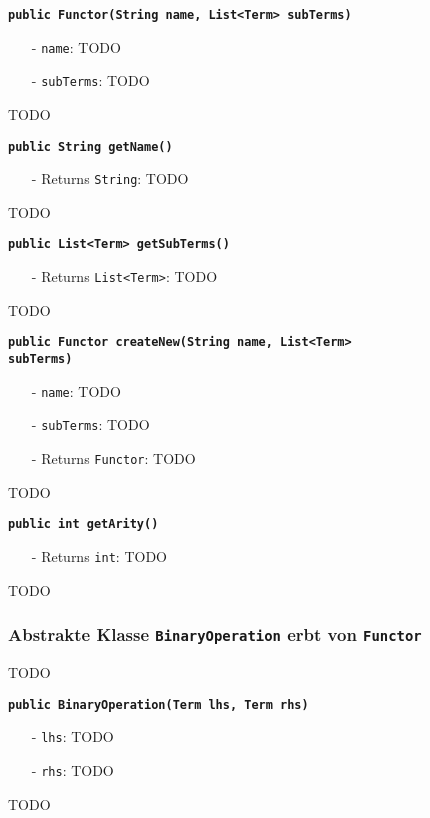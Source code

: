 \documentclass[parskip=full,11pt,twoside]{scrartcl}
\begin{document}
\textbf{\texttt{public Functor(String name, List<Term> subTerms)}}
\begin{itemize}[noitemsep]
	\item[-] \texttt{name}: TODO
	\item[-] \texttt{subTerms}: TODO
\end{itemize}
TODO

\textbf{\texttt{public String getName()}}
\begin{itemize}[noitemsep]
	\item[-] Returns \texttt{String}: TODO
\end{itemize}
TODO

\textbf{\texttt{public List<Term> getSubTerms()}}
\begin{itemize}[noitemsep]
	\item[-] Returns \texttt{List<Term>}: TODO
\end{itemize}
TODO

\textbf{\texttt{public Functor createNew(String name, List<Term>\\subTerms)}}
\begin{itemize}[noitemsep]
	\item[-] \texttt{name}: TODO
	\item[-] \texttt{subTerms}: TODO
	\item[-] Returns \texttt{Functor}: TODO
\end{itemize}
TODO

\textbf{\texttt{public int getArity()}}
\begin{itemize}[noitemsep]
	\item[-] Returns \texttt{int}: TODO
\end{itemize}
TODO

\subsubsection{Abstrakte Klasse \texttt{BinaryOperation} erbt von \texttt{Functor}}
TODO

\textbf{\texttt{public BinaryOperation(Term lhs, Term rhs)}}
\begin{itemize}[noitemsep]
	\item[-] \texttt{lhs}: TODO
	\item[-] \texttt{rhs}: TODO
\end{itemize}
TODO
\end{document}
